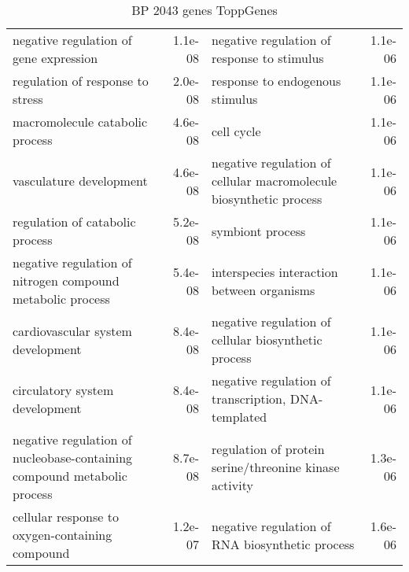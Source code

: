 \documentclass[fleqn,10pt]{SelfArx} %
\begin{document}
\begin{table}[ht]
\begin{tabularx}{\textwidth}{lRlR}
		negative regulation of gene expression & 1.1e-08 & negative regulation of response to stimulus & 1.1e-06 \\ 
		regulation of response to stress & 2.0e-08 & response to endogenous stimulus & 1.1e-06 \\ 
		macromolecule catabolic process & 4.6e-08 & cell cycle & 1.1e-06 \\ 
		vasculature development & 4.6e-08 & negative regulation of cellular macromolecule biosynthetic process & 1.1e-06 \\ 
		regulation of catabolic process & 5.2e-08 & symbiont process & 1.1e-06 \\ 
		negative regulation of nitrogen compound metabolic process & 5.4e-08 & interspecies interaction between organisms & 1.1e-06 \\ 
		cardiovascular system development & 8.4e-08 & negative regulation of cellular biosynthetic process & 1.1e-06 \\ 
		circulatory system development & 8.4e-08 & negative regulation of transcription, DNA-templated & 1.1e-06 \\ 
		negative regulation of nucleobase-containing compound metabolic process & 8.7e-08 & regulation of protein serine/threonine kinase activity & 1.3e-06 \\ 
		cellular response to oxygen-containing compound & 1.2e-07 & negative regulation of RNA biosynthetic process & 1.6e-06 \\ 
	\end{tabularx}
	\smallskip
	\caption{BP 2043 genes ToppGenes}
	\label{tab:bp2043}
\end{table}
\end{document}
